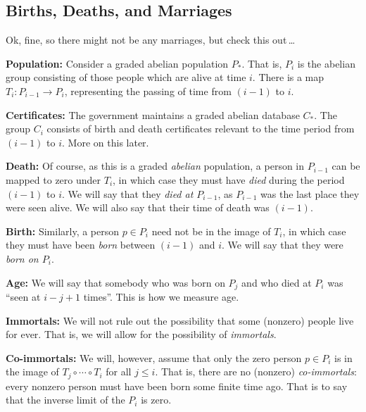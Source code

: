 \documentclass[11pt]{article}
\newcommand{\myheading}[1]
{{\noindent\Large #1}

}
\renewcommand{\myheading}[1]{\subsection{#1}}
\begin{document}
%
%
\myheading{Births, Deaths, and Marriages}%
Ok, fine, so there might not be any marriages, but check this out\,\ldots

\Bullet \textbf{Population:} Consider a graded abelian population $P_*$. That
is, $P_i$ is the abelian group consisting of those people which are alive at
time $i$. There is a map $T_{i}:P_{i-1}\to P_{i}$, representing the passing of
time from $(i-1)$ to $i$.

\Bullet \textbf{Certificates:} The government maintains a graded abelian
database $C_*$. The group $C_i$ consists of birth and death certificates
relevant to the time period from $(i-1)$ to $i$. More on this later.

\Bullet \textbf{Death:} Of course, as this is a graded \emph{abelian}
population, a person in $P_{i-1}$ can be mapped to zero under $T_{i}$, in which
case they must have \emph{died} during the period $(i-1)$ to $i$. We will say
that they \emph{died at $P_{i-1}$}, as $P_{i-1}$ was the last place they were
seen alive. We will also say that their time of death was $(i-1)$.

\Bullet \textbf{Birth:} Similarly, a person $p\in P_i$ need not be in the image
of $T_{i}$, in which case they must have been \emph{born} between $(i-1)$ and
$i$. We will say that they were \emph{born on $P_i$}.

\Bullet \textbf{Age:} We will say that somebody who was born on $P_j$ and who
died at $P_i$ was ``seen at $i-j+1$ times''. This is how we measure age.

\Bullet \textbf{Immortals:} We will not rule out the possibility that some
(nonzero) people live for ever. That is, we will allow for the possibility of
\emph{immortals}.

\Bullet \textbf{Co-immortals:} We will, however, assume that only the zero
person $p\in P_i$ is in the image of $T_{j}\circ\cdots\circ T_i$ for all $j\leq
i$. That is, there are no (nonzero) \emph{co-immortals}: every nonzero person
must have been born some finite time ago. That is to say that the inverse limit
of the $P_i$ is zero.
\end{document}
